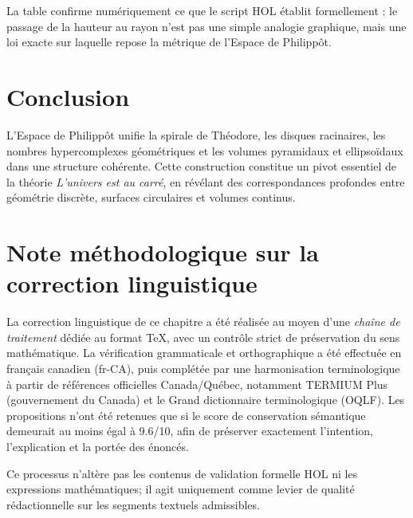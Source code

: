 \documentclass[12pt]{article}
\begin{document}
La table confirme numériquement ce que le script HOL établit formellement :
le passage de la hauteur au rayon n’est pas une simple analogie graphique,
mais une loi exacte sur laquelle repose la métrique de l’Espace de Philippôt.

\section*{Conclusion}

L’Espace de Philippôt unifie la spirale de Théodore, les disques racinaires, les nombres hypercomplexes géométriques et les volumes pyramidaux et ellipsoïdaux dans une structure cohérente. Cette construction constitue un pivot essentiel de la théorie \emph{L’univers est au carré}, en révélant des correspondances profondes entre géométrie discrète, surfaces circulaires et volumes continus.

\section*{Note méthodologique sur la correction linguistique}

La correction linguistique de ce chapitre a été réalisée au moyen d’une \emph{chaîne de traitement} dédiée au format TeX, avec un contrôle strict de préservation du sens mathématique. La vérification grammaticale et orthographique a été effectuée en français canadien (fr-CA), puis complétée par une harmonisation terminologique à partir de références officielles Canada/Québec, notamment TERMIUM Plus (gouvernement du Canada) et le Grand dictionnaire terminologique (OQLF). Les propositions n’ont été retenues que si le score de conservation sémantique demeurait au moins égal à 9.6/10, afin de préserver exactement l’intention, l’explication et la portée des énoncés.

Ce processus n’altère pas les contenus de validation formelle HOL ni les expressions mathématiques; il agit uniquement comme levier de qualité rédactionnelle sur les segments textuels admissibles.
\end{document}
